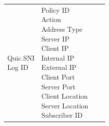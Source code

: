 \begin{description}
\begin{longtable}{p{}|p{}|p{}|p{}}
{                                                                                                    Quic.SNI\\
                                                                                                    Log ID}  &  %
                                                                                                              \tabincell{l}{Policy ID\\
                                                                                                                            Action\\
                                                                                                                            Address Type\\
                                                                                                                            Server IP\\
                                                                                                                            Client IP\\
                                                                                                                            Internal IP\\
                                                                                                                            External IP\\
                                                                                                                            Client Port\\
                                                                                                                            Server Port\\
                                                                                                                            Client Location\\
                                                                                                                            Server Location\\
                                                                                                                            Subscriber ID\\
}
\end{longtable}
\end{description}
